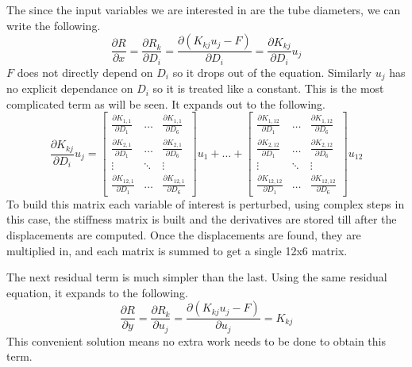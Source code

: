 \documentclass[12pt,parskip=full]{article}
\numberwithin{subsection}{section}
\begin{document}
		The since the input variables we are interested in are the tube diameters, we can write the following.
		\begin{equation}
			\frac{\partial R}{\partial x} = \frac{\partial R_k}{\partial D_i} = \frac{\partial (K_{kj}u_j - F)}{\partial D_i} = \frac{\partial K_{kj}}{\partial D_i}u_j
		\end{equation}
		$F$ does not directly depend on $D_i$ so it drops out of the equation. Similarly $u_j$ has no explicit dependance on $D_i$ so it is
		treated like a constant. This is the most complicated term as will be seen. It expands out to the following.
		\begin{equation}
			\frac{\partial K_{kj}}{\partial D_i}u_j = \begin{bmatrix} \frac{\partial K_{1,1}}{\partial D_1} & \dots & \frac{\partial K_{1,1}}{\partial D_6} \\
 												                     \frac{\partial K_{2,1}}{\partial D_1} & \dots & \frac{\partial K_{2,1}}{\partial D_6} \\
 												                     \vdots & \ddots & \vdots \\
 												                     \frac{\partial K_{12,1}}{\partial D_1} & \dots & \frac{\partial K_{12,1}}{\partial D_6} \end{bmatrix}u_1
 												                     + \dots + 
 												     \begin{bmatrix} \frac{\partial K_{1,12}}{\partial D_1} & \dots & \frac{\partial K_{1,12}}{\partial D_6} \\
 												                     \frac{\partial K_{2,12}}{\partial D_1} & \dots & \frac{\partial K_{2,12}}{\partial D_6} \\
 												                     \vdots & \ddots & \vdots \\
 												                     \frac{\partial K_{12,12}}{\partial D_1} & \dots & \frac{\partial K_{12,12}}{\partial D_6} \end{bmatrix}u_{12}
		\end{equation}
		To build this matrix each variable of interest is perturbed, using complex steps in this case, the stiffness matrix is built and
		the derivatives are stored till after the displacements are computed. Once the displacements are found, they are multiplied in,
		and each matrix is summed to get a single 12x6 matrix.

		The next residual term is much simpler than the last. Using the same residual equation, it expands to the following.
		\begin{equation}
			\frac{\partial R}{\partial y} = \frac{\partial R_k}{\partial u_j} = \frac{\partial (K_{kj}u_j - F)}{\partial u_j} = K_{kj}
		\end{equation}
		This convenient solution means no extra work needs to be done to obtain this term.
		
\end{document}
